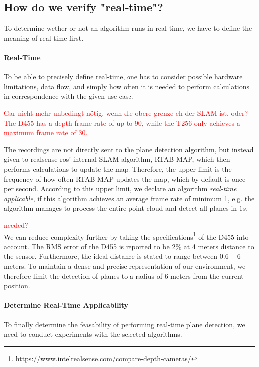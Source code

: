 \documentclass[main.tex]{subfiles}
\begin{document}
\subsection*{How do we verify "real-time"?}
To determine wether or not an algorithm runs in real-time, we have to define the meaning of real-time first.

\paragraph*{Real-Time}
    To be able to precisely define real-time, one has to consider possible hardware limitations, data flow, and simply
    how often it is needed to perform calculations in correspondence with the given use-case.

\textcolor{red}{Gar nicht mehr unbedingt nötig, wenn die obere grenze eh der SLAM ist, oder?
        The D455 has a depth frame rate of up to 90, while the T256 only achieves a maximum frame rate of 30.}

    The recordings are not directly sent to the plane detection algorithm, but instead given to realsense-ros' internal
    SLAM algorithm, RTAB-MAP, which then performs calculations to update the map.
    Therefore, the upper limit is the frequency of how often RTAB-MAP updates the map, which by default is once per second.
    According to this upper limit, we declare an algorithm \textit{real-time applicable}, if this algorithm achieves an average frame 
    rate of minimum 1, e.g. the algorithm manages to process the entire point cloud and detect all planes in $1s$.

\textcolor{red}{needed?}\\
We can reduce complexity further by taking the specifications\footnote{\href{https://www.intelrealsense.com/compare-depth-cameras/}{https://www.intelrealsense.com/compare-depth-cameras/}} 
of the D455 into account. The RMS error of the D455 is reported to be 2\% at 4 meters distance to the sensor. 
Furthermore, the ideal distance is stated to range between $0.6 - 6$ meters.
To maintain a dense and precise representation of our environment, we therefore limit the detection of planes to a
radius of 6 meters from the current position.

\paragraph*{Determine Real-Time Applicability}

To finally determine the feasability of performing real-time plane detection, we need to conduct experiments with the selected algorithms.
\end{document}
